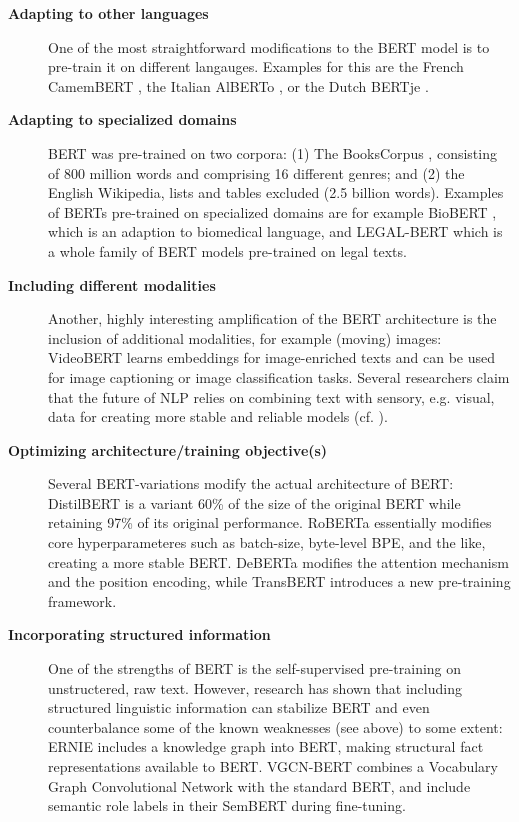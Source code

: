 \begin{description}
  \item[\textbf{Adapting to other languages}] One of the most straightforward modifications to the BERT model is to pre-train it on different langauges. Examples for this are the French CamemBERT \cite{martin2019camembert}, the Italian AlBERTo \cite{polignano2019alberto}, or the Dutch BERTje \cite{de2019bertje}.
  \item[\textbf{Adapting to specialized domains}] BERT was pre-trained on two corpora: (1) The BooksCorpus \citep{zhu2015aligning}, consisting of 800 million words and comprising 16 different genres; and (2) the English Wikipedia, lists and tables excluded (2.5 billion words).
  Examples of BERTs pre-trained on specialized domains are for example BioBERT \cite{lee2020biobert}, which  is an adaption to biomedical language, and LEGAL-BERT \cite{chalkidis2020legalbert} which is a whole family of BERT models pre-trained on legal texts.
  \item[\textbf{Including different modalities}] Another, highly interesting amplification of the BERT architecture is the inclusion of additional modalities, for example (moving) images: VideoBERT \cite{sun2019videobert} learns embeddings for image-enriched texts and can be used for image captioning or image classification tasks.
  Several researchers claim that the future of NLP relies on combining text with sensory, e.g. visual, data for creating more stable and reliable models (cf. \citep{bisk2020experience, bender2021dangers}).
  \item[\textbf{Optimizing architecture/training objective(s)}] Several BERT-variations modify the actual architecture of BERT:  DistilBERT \cite{sanh2019distilbert} is a variant 60\% of the size of the original BERT while retaining 97\% of its original performance.
  RoBERTa \cite{liu2019roberta} essentially modifies core hyperparameteres such as batch-size, byte-level BPE, and the like, creating a more stable BERT.
  DeBERTa \cite{he2020deberta} modifies the attention mechanism and the position encoding, while TransBERT \cite{li2021transbert} introduces a new pre-training framework.
  \item[\textbf{Incorporating structured information}] One of the strengths of BERT is the self-supervised pre-training on unstructered, raw text. However, research has shown that including structured linguistic information can stabilize BERT and even counterbalance some of the known weaknesses (see above) to some extent:
  ERNIE \cite{sun2019ernie} includes a knowledge graph into BERT, making structural fact representations available to BERT.
  VGCN-BERT \cite{lu2020vgcn} combines a Vocabulary Graph Convolutional Network with the standard BERT, and \cite{zhang2019semantics} include semantic role labels in their SemBERT during fine-tuning.
\end{description}


